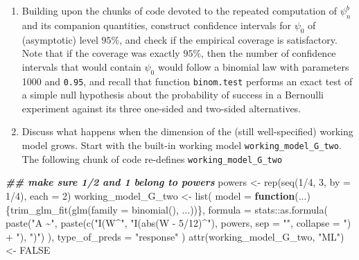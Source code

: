 \documentclass[
  11pt,
  openright,twoside]{book}
\newenvironment{Shaded}{\begin{snugshade}}{\end{snugshade}}
\newcommand{\AttributeTok}[1]{\textcolor[rgb]{0.77,0.63,0.00}{#1}}
\newcommand{\ConstantTok}[1]{\textcolor[rgb]{0.00,0.00,0.00}{#1}}
\newcommand{\ControlFlowTok}[1]{\textcolor[rgb]{0.13,0.29,0.53}{\textbf{#1}}}
\newcommand{\DecValTok}[1]{\textcolor[rgb]{0.00,0.00,0.81}{#1}}
\newcommand{\DocumentationTok}[1]{\textcolor[rgb]{0.56,0.35,0.01}{\textbf{\textit{#1}}}}
\newcommand{\FunctionTok}[1]{\textcolor[rgb]{0.00,0.00,0.00}{#1}}
\newcommand{\NormalTok}[1]{#1}
\newcommand{\OtherTok}[1]{\textcolor[rgb]{0.56,0.35,0.01}{#1}}
\newcommand{\SpecialCharTok}[1]{\textcolor[rgb]{0.00,0.00,0.00}{#1}}
\newcommand{\StringTok}[1]{\textcolor[rgb]{0.31,0.60,0.02}{#1}}
\theoremstyle{definition}
\theoremstyle{definition}
\theoremstyle{definition}
\theoremstyle{definition}
\theoremstyle{remark}
\begin{document}
\begin{enumerate}
\def\labelenumi{\arabic{enumi}.}
\item
  Building upon the chunks of code devoted to the repeated computation of
  \(\psi_{n}^{b}\) and its companion quantities, construct confidence intervals
  for \(\psi_{0}\) of (asymptotic) level \(95\%\), and check if the empirical
  coverage is satisfactory. Note that if the coverage was exactly \(95\%\), then
  the number of confidence intervals that would contain \(\psi_{0}\) would follow
  a binomial law with parameters 1000 and \texttt{0.95}, and recall that function
  \texttt{binom.test} performs an exact test of a simple null hypothesis about the
  probability of success in a Bernoulli experiment against its three one-sided
  and two-sided alternatives.
\item
  Discuss what happens when the dimension of the (still well-specified) working model grows. Start with the built-in working model \texttt{working\_model\_G\_two}. The following chunk of code re-defines \texttt{working\_model\_G\_two}
\end{enumerate}

\begin{Shaded}
\begin{Highlighting}[]
\DocumentationTok{\#\# make sure \textquotesingle{}1/2\textquotesingle{} and \textquotesingle{}1\textquotesingle{} belong to \textquotesingle{}powers\textquotesingle{}}
\NormalTok{powers }\OtherTok{\textless{}{-}} \FunctionTok{rep}\NormalTok{(}\FunctionTok{seq}\NormalTok{(}\DecValTok{1}\SpecialCharTok{/}\DecValTok{4}\NormalTok{, }\DecValTok{3}\NormalTok{, }\AttributeTok{by =} \DecValTok{1}\SpecialCharTok{/}\DecValTok{4}\NormalTok{), }\AttributeTok{each =} \DecValTok{2}\NormalTok{) }
\NormalTok{working\_model\_G\_two }\OtherTok{\textless{}{-}} \FunctionTok{list}\NormalTok{(}
  \AttributeTok{model =} \ControlFlowTok{function}\NormalTok{(...) \{}\FunctionTok{trim\_glm\_fit}\NormalTok{(}\FunctionTok{glm}\NormalTok{(}\AttributeTok{family =} \FunctionTok{binomial}\NormalTok{(), ...))\},}
  \AttributeTok{formula =}\NormalTok{ stats}\SpecialCharTok{::}\FunctionTok{as.formula}\NormalTok{(}
    \FunctionTok{paste}\NormalTok{(}\StringTok{"A \textasciitilde{}"}\NormalTok{,}
          \FunctionTok{paste}\NormalTok{(}\FunctionTok{c}\NormalTok{(}\StringTok{"I(W\^{}"}\NormalTok{, }\StringTok{"I(abs(W {-} 5/12)\^{}"}\NormalTok{),}
\NormalTok{                powers, }
                \AttributeTok{sep =} \StringTok{""}\NormalTok{, }\AttributeTok{collapse =} \StringTok{") + "}\NormalTok{),}
          \StringTok{")"}\NormalTok{)}
\NormalTok{  ),}
  \AttributeTok{type\_of\_preds =} \StringTok{"response"}
\NormalTok{)}
\FunctionTok{attr}\NormalTok{(working\_model\_G\_two, }\StringTok{"ML"}\NormalTok{) }\OtherTok{\textless{}{-}} \ConstantTok{FALSE}
\end{Highlighting}
\end{Shaded}
\end{document}
